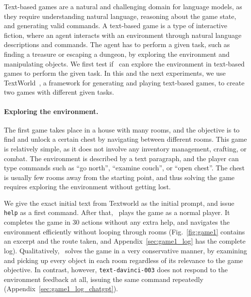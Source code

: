 Text-based games are a natural and challenging domain for language models, as they require understanding natural language, reasoning about the game state, and generating valid commands. A text-based game is a type of interactive fiction, where an agent interacts with an environment through natural language descriptions and commands. The agent has to perform a given task, such as finding a treasure or escaping a dungeon, by exploring the environment and manipulating objects. We first test if \DV\ can explore the environment in text-based games to perform the given task. In this and the next experiments, we use TextWorld~\cite{cote2018textworld}, a framework for generating and playing text-based games, to create two games with different given tasks.

\paragraph{Exploring the environment.}
The first game takes place in a house with many rooms, and the objective is to find and unlock a certain chest by navigating between different rooms.
This game is relatively simple, as it does not involve any inventory management, crafting, or combat.
The environment is described by a text paragraph, and the player can type commands such as ``go north'', ``examine couch'', or ``open chest''.
The chest is usually few rooms away from the starting point, and thus solving the game requires exploring the environment without getting lost.

We give the exact initial text from Textworld as the initial prompt, and issue \texttt{help} as a first command. After that, \DV\ plays the game as a normal player. It completes the game in 30 actions without any extra help, and navigates the environment efficiently without looping through rooms (Fig.~\ref{fig:game1} contains an excerpt and the route taken, and Appendix~\ref{sec:game1_log} has the complete log). Qualitatively, \DV\ solves the game in a very conservative manner, by examining and picking up every object in each room regardless of its relevance to the game objective. In contrast, however, \texttt{text-davinci-003} does not respond to the environment feedback at all, issuing the same command repeatedly (Appendix~\ref{sec:game1_log_chatgpt}).

